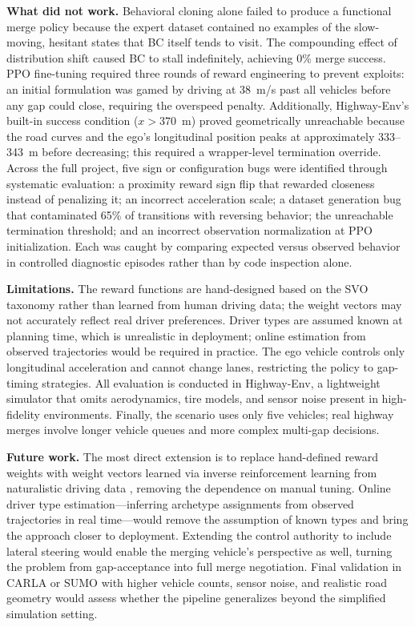\documentclass[conference]{IEEEtran}
\begin{document}
\textbf{What did not work.}
Behavioral cloning alone failed to produce a functional merge policy
because the expert dataset contained no examples of the slow-moving,
hesitant states that BC itself tends to visit.
The compounding effect of distribution shift caused BC to stall
indefinitely, achieving 0\% merge success.
PPO fine-tuning required three rounds of reward engineering to prevent
exploits: an initial formulation was gamed by driving at 38~m/s past all
vehicles before any gap could close, requiring the overspeed penalty.
Additionally, Highway-Env's built-in success condition ($x > 370$~m)
proved geometrically unreachable because the road curves and the ego's
longitudinal position peaks at approximately 333--343~m before decreasing;
this required a wrapper-level termination override.
Across the full project, five sign or configuration bugs were identified
through systematic evaluation: a proximity reward sign flip that rewarded
closeness instead of penalizing it; an incorrect acceleration scale; a
dataset generation bug that contaminated 65\% of transitions with
reversing behavior; the unreachable termination threshold; and
an incorrect observation normalization at PPO initialization.
Each was caught by comparing expected versus observed behavior in
controlled diagnostic episodes rather than by code inspection alone.

\textbf{Limitations.}
The reward functions are hand-designed based on the SVO taxonomy rather
than learned from human driving data; the weight vectors may not accurately
reflect real driver preferences.
Driver types are assumed known at planning time, which is unrealistic
in deployment; online estimation from observed trajectories would be
required in practice.
The ego vehicle controls only longitudinal acceleration and cannot change
lanes, restricting the policy to gap-timing strategies.
All evaluation is conducted in Highway-Env, a lightweight simulator that
omits aerodynamics, tire models, and sensor noise present in high-fidelity
environments.
Finally, the scenario uses only five vehicles; real highway merges involve
longer vehicle queues and more complex multi-gap decisions.

\textbf{Future work.}
The most direct extension is to replace hand-defined reward weights with
weight vectors learned via inverse reinforcement learning from naturalistic
driving data \cite{huang2021personalized}, removing the dependence on
manual tuning.
Online driver type estimation---inferring archetype assignments from
observed trajectories in real time---would remove the assumption of known
types and bring the approach closer to deployment.
Extending the control authority to include lateral steering would enable
the merging vehicle's perspective as well, turning the problem from
gap-acceptance into full merge negotiation.
Final validation in CARLA or SUMO with higher vehicle counts, sensor
noise, and realistic road geometry would assess whether the pipeline
generalizes beyond the simplified simulation setting.
\end{document}
